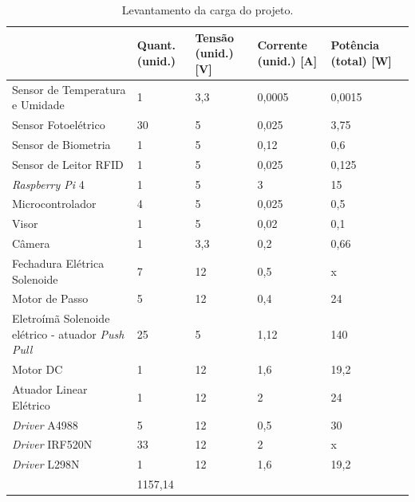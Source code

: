 \begin{table}[htb]
    \centering
    \caption{Levantamento da carga do projeto.}
    \label{fig:energia_carga}
    \begin{adjustbox}{max width = \textwidth}
        \begin{tabular}{|L{5cm}|C{2cm}|C{2cm}|C{2cm}|C{2cm}|C{2cm}|}
            \hline
            & \textbf{Quant. (unid.)} & \textbf{Tensão (unid.) [V]} & \textbf{Corrente (unid.) [A]} & \textbf{Potência (total) [W]} \\ \hline
            Sensor de Temperatura e Umidade & 1	 & 3,3 & 0,0005 & 0,0015
            \\ \hline
              Sensor Fotoelétrico & 30	 & 5  & 0,025 & 3,75
             \\ \hline
             Sensor de Biometria & 1 & 5 & 0,12 & 0,6
             \\ \hline
             Sensor de Leitor RFID & 1	 & 5 & 0,025 & 0,125
             \\ \hline
              \textit{Raspberry Pi} 4 & 1 & 5 & 3 & 15
             \\ \hline
               Microcontrolador & 4 & 5 & 0,025 & 0,5
             \\ \hline
               Visor & 1 & 5 & 0,02 & 0,1
             \\ \hline
               Câmera & 1 & 3,3 & 0,2 & 0,66
             \\ \hline
              Fechadura Elétrica Solenoide & 7 & 12 & 0,5 & x
             \\ \hline
              Motor de Passo & 5 & 12 & 0,4 & 24
             \\ \hline
              Eletroímã Solenoide elétrico - atuador \textit{Push Pull} & 25 & 5 & 1,12 & 140
             \\ \hline
                Motor DC & 1 & 12 & 1,6 & 19,2
             \\ \hline
                Atuador Linear Elétrico & 1 & 12 & 2 & 24
             \\ \hline
               \textit{Driver} A4988 & 5 & 12 & 0,5 & 30
             \\ \hline
                \textit{Driver} IRF520N & 33 & 12 & 2 & x
             \\ \hline
                  \textit{Driver} L298N & 1 & 12 & 1,6 & 19,2
             \\ \hline
              & 1157,14 \\
             \hline
        \end{tabular}
    \end{adjustbox}
\end{table}

